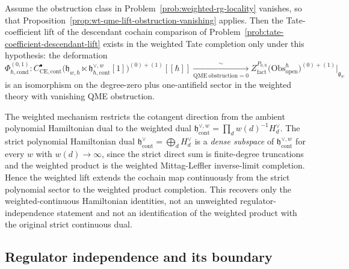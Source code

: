 \begin{cor}\label{cor:wt-descendant-qme-vanishing}
  Assume the obstruction class in
  Problem~\ref{prob:weighted-rg-locality} vanishes, so that
  Proposition~\ref{prop:wt-qme-lift-obstruction-vanishing} applies.  Then the
  Tate-coefficient lift of the descendant cochain comparison of
  Problem~\ref{prob:tate-coefficient-descendant-lift} exists in the
  weighted Tate completion only under this hypothesis: the deformation
  $$\Phi_{\hbar,\mathrm{cond}}^{(0,1)}\colon
    C^\bullet_{\mathrm{CE},\mathrm{cont}}\bigl(
    \mathfrak h_{w,\hbar}\ltimes\mathfrak h^{\vee,w}_{\hbar,\mathrm{cont}}[1]
    \bigr)^{(0)+(1)}[[\hbar]]
    \xrightarrow[\mathrm{QME\ obstruction}=0]{\sim}
    Z^{P_{0,\hbar}}_{\mathrm{fact}}\bigl(\mathrm{Obs}^\hbar_{\mathrm{open}}
    \bigr)^{(0)+(1)}|_{\mathfrak g_w}$$
  is an isomorphism on the degree-zero plus one-antifield sector in the
  weighted theory with vanishing QME obstruction.
\end{cor}

\begin{rmk}\label{rmk:wt-sector-restriction}
  The weighted mechanism restricts the cotangent direction from the
  ambient polynomial Hamiltonian dual to the weighted dual
  $\mathfrak h^{\vee,w}_{\mathrm{cont}}=\prod_d w(d)^{-1}H_d^\vee$.
  The strict polynomial Hamiltonian dual
  $\mathfrak h^\vee_{\mathrm{cont}}=\bigoplus_d H_d^\vee$ is a
  \emph{dense subspace} of $\mathfrak h^{\vee,w}_{\mathrm{cont}}$
  for every $w$ with $w(d)\to\infty$, since the strict direct sum
  is finite-degree truncations and the weighted product is the
  weighted Mittag-Leffler inverse-limit completion. Hence the
  weighted lift extends the cochain map continuously from the strict
  polynomial sector to the weighted product completion. This recovers
  only the weighted-continuous Hamiltonian identities, not an
  unweighted regulator-independence statement and not an identification
  of the weighted product with the original strict continuous dual.
\end{rmk}

\subsection*{Regulator independence and its boundary}

